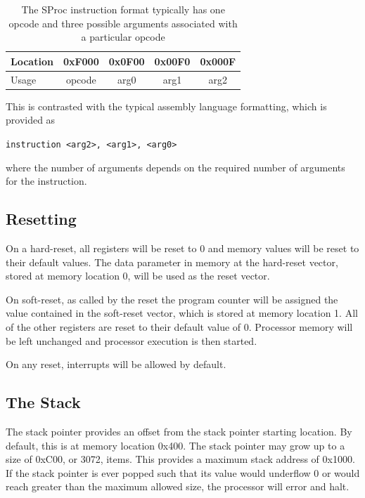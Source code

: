 \documentclass{article}
\begin{document}
\begin{table}[h!]
	\centering
	\begin{tabular}{l|cccc}
		\hline
		Location & 0xF000 & 0x0F00 & 0x00F0 & 0x000F \\
		\hline
		Usage & opcode & arg0 & arg1 & arg2 \\
		\hline
	\end{tabular}
	\caption{The SProc instruction format typically has one opcode and three possible arguments associated with a particular opcode}
	\label{table:instruction-formatting}
\end{table}

This is contrasted with the typical assembly language formatting, which is provided as

\begin{center}
	\texttt{instruction <arg2>, <arg1>, <arg0>}
\end{center}

where the number of arguments depends on the required number of arguments for the instruction.

\subsection{Resetting}

On a hard-reset, all registers will be reset to 0 and memory values will be reset to their default values. The data parameter in memory at the hard-reset vector, stored at memory location 0, will be used as the reset vector.

On soft-reset, as called by the reset the program counter will be assigned the value contained in the soft-reset vector, which is stored at memory location 1. All of the other registers are reset to their default value of 0. Processor memory will be left unchanged and processor execution is then started.

On any reset, interrupts will be allowed by default.

\subsection{The Stack}
\label{sec:the-stack}

The stack pointer provides an offset from the stack pointer starting location. By default, this is at memory location 0x400. The stack pointer may grow up to a size of 0xC00, or 3072, items. This provides a maximum stack address of 0x1000. If the stack pointer is ever popped such that its value would underflow 0 or would reach greater than the maximum allowed size, the processor will error and halt.
\end{document}
